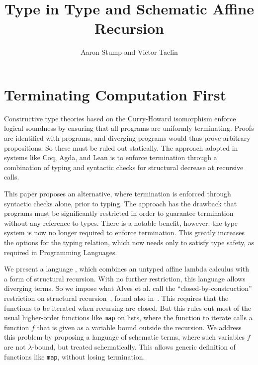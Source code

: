 \documentclass{article}
\begin{document}


\title{Type in Type and Schematic Affine Recursion}

\author{Aaron Stump and Victor Taelin}

\maketitle

\section{Terminating Computation First}

Constructive type theories based on the Curry-Howard isomorphism
enforce logical soundness by ensuring that all programs are uniformly
terminating.  Proofs are identified with programs, and diverging
programs would thus prove arbitrary propositions.  So these must be
ruled out statically.  The approach adopted in systems like Coq, Agda,
and Lean is to enforce termination through a combination of typing
and syntactic checks for structural decrease at recursive calls.

This paper proposes an alternative, where termination is enforced
through syntactic checks alone, prior to typing.  The approach has the
drawback that programs must be significantly restricted in order to
guarantee termination without any reference to types.  There is a
notable benefit, however: the type system is now no longer required to
enforce termination.  This greatly increases the options for the
typing relation, which now needs only to satisfy type safety, as
required in Programming Languages.

We present a language \sar, which combines an untyped affine lambda
calculus with a form of structural recursion.  With no further
restriction, this language allows diverging terms.  So we impose what
Alves et al. call the ``closed-by-construction'' restriction on
structural recursion~\cite{alves10}, found also in~\cite{dallago09}.
This requires that the functions to be iterated when recursing are
closed.  But this rules out most of the usual higher-order functions
like \texttt{map} on lists, where the function to iterate calls a
function $f$ that is given as a variable bound outside the recursion.
We address this problem by proposing a language of schematic terms,
where such variables $f$ are not $\lambda$-bound, but treated
schematically.  This allows generic definition of functions like
\texttt{map}, without losing termination.
\end{document}
